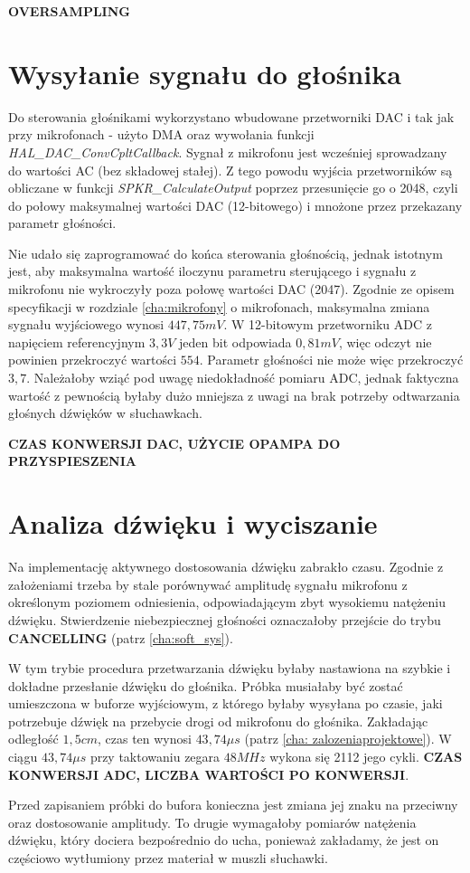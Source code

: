 \textbf{OVERSAMPLING}

\section{Wysyłanie sygnału do głośnika}
\label{cha:soft_spkr}

Do sterowania głośnikami wykorzystano wbudowane przetworniki DAC i tak jak przy mikrofonach - użyto DMA oraz wywołania funkcji \textit{HAL\_DAC\_ConvCpltCallback}. Sygnał z mikrofonu jest wcześniej sprowadzany do wartości AC (bez składowej stałej). Z tego powodu wyjścia przetworników są obliczane w funkcji \textit{SPKR\_CalculateOutput} poprzez przesunięcie go o 2048, czyli do połowy maksymalnej wartości DAC (12-bitowego) i mnożone przez przekazany parametr głośności. 

Nie udało się zaprogramować do końca sterowania głośnością, jednak istotnym jest, aby maksymalna wartość iloczynu parametru sterującego i sygnału z mikrofonu nie wykroczyły poza połowę wartości DAC (2047). Zgodnie ze opisem specyfikacji w rozdziale \ref{cha:mikrofony} o mikrofonach, maksymalna zmiana sygnału wyjściowego wynosi $447,75 mV$. W 12-bitowym przetworniku ADC z napięciem referencyjnym $3,3V$ jeden bit odpowiada $0,81mV$, więc odczyt nie powinien przekroczyć wartości $554$. Parametr głośności nie może więc przekroczyć $3,7$. Należałoby wziąć pod uwagę niedokładność pomiaru ADC, jednak faktyczna wartość z pewnością byłaby dużo mniejsza z uwagi na brak potrzeby odtwarzania głośnych dźwięków w słuchawkach.

\textbf{CZAS KONWERSJI DAC, UŻYCIE OPAMPA DO PRZYSPIESZENIA}

\section{Analiza dźwięku i wyciszanie}
\label{cha:soft_analysis}

Na implementację aktywnego dostosowania dźwięku zabrakło czasu. Zgodnie z założeniami trzeba by stale porównywać amplitudę sygnału mikrofonu z określonym poziomem odniesienia, odpowiadającym zbyt wysokiemu natężeniu dźwięku. Stwierdzenie niebezpiecznej głośności oznaczałoby przejście do trybu \textbf{CANCELLING} (patrz \ref{cha:soft_sys}).

W tym trybie procedura przetwarzania dźwięku byłaby nastawiona na szybkie i dokładne przesłanie dźwięku do głośnika. Próbka musiałaby być zostać umieszczona w buforze wyjściowym, z którego byłaby wysyłana po czasie, jaki potrzebuje dźwięk na przebycie drogi od mikrofonu do głośnika. Zakładając odległość $1,5cm$, czas ten wynosi $43,74 \mu s$ (patrz \ref{cha: zalozeniaprojektowe}). W ciągu $43,74 \mu s$ przy taktowaniu zegara $48MHz$ wykona się 2112 jego cykli. \textbf{CZAS KONWERSJI ADC, LICZBA WARTOŚCI PO KONWERSJI}.

Przed zapisaniem próbki do bufora konieczna jest zmiana jej znaku na przeciwny oraz dostosowanie amplitudy. To drugie wymagałoby pomiarów natężenia dźwięku, który dociera bezpośrednio do ucha, ponieważ zakładamy, że jest on częściowo wytłumiony przez materiał w muszli słuchawki.